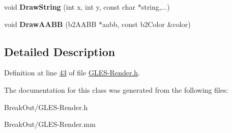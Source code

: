 \begin{DoxyCompactItemize}
\item 
\hypertarget{class_g_l_e_s_debug_draw_a16aaca99009b9423fe288b5815c8dbcf}{void {\bfseries Draw\-String} (int x, int y, const char $\ast$string,...)}\label{d7/da9/class_g_l_e_s_debug_draw_a16aaca99009b9423fe288b5815c8dbcf}

\item 
\hypertarget{class_g_l_e_s_debug_draw_a6dc5d6adbc8279c9d378311b66ddcf53}{void {\bfseries Draw\-A\-A\-B\-B} (b2\-A\-A\-B\-B $\ast$aabb, const b2\-Color \&color)}\label{d7/da9/class_g_l_e_s_debug_draw_a6dc5d6adbc8279c9d378311b66ddcf53}

\end{DoxyCompactItemize}


\subsection{Detailed Description}


Definition at line \hyperlink{_g_l_e_s-_render_8h_source_l00043}{43} of file \hyperlink{_g_l_e_s-_render_8h_source}{G\-L\-E\-S-\/\-Render.\-h}.



The documentation for this class was generated from the following files\-:\begin{DoxyCompactItemize}
\item 
Break\-Out/G\-L\-E\-S-\/\-Render.\-h\item 
Break\-Out/G\-L\-E\-S-\/\-Render.\-mm\end{DoxyCompactItemize}
